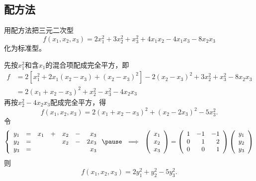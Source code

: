 \subsection{配方法}


\begin{frame}
  
    \begin{li}
      用配方法把三元二次型
      $$
      f(x_1,x_2,x_3)=2x_1^2+3x_2^2+x_3^2+4x_1x_2-4x_1x_3-8x_2x_3
      $$
      化为标准型。
    \end{li}
    \begin{jie}
    先按$x_1^2$和含$x_1$的混合项配成完全平方，即
    $$
    \begin{array}{rl}
      f&=2[x_1^2+2x_1(x_2-x_3)+(x_2-x_3)^2]-2(x_2-x_3)^2+3x_2^2+x_3^2-8x_2x_3\\[0.1in]
      &=2(x_1+x_2-x_3)^2+x_2^2-x_3^2-4x_2x_3
    \end{array}
    $$\pause
    再按$x_2^2-4x_2x_3$配成完全平方，得
    $$
    f(x_1,x_2,x_3)=2(x_1+x_2-x_3)^2+(x_2-2x_3)^2-5x_3^2.
    $$
    \pause
    令
    $$
    \left\{
    \begin{array}{rcrcrcr}
      y_1&=&x_1&+&x_2&-&x_3\\
      y_2&=& &&x_2&-&2x_3\\
      y_3&=&&&&&x_3
    \end{array}
    \right. \pause ~~\Longrightarrow~~
    \left(
    \begin{array}{c}
      x_1\\
      x_2\\
      x_3
    \end{array}
    \right)=
    \left(
    \begin{array}{rrr}
      1&-1&-1\\
      0&1&2\\
      0&0&1
    \end{array}
    \right)
    \left(
    \begin{array}{c}
      y_1\\
      y_2\\
      y_3
    \end{array}
    \right)
    $$ \pause 
    则
    $$
    f(x_1,x_2,x_3)=2y_1^2+y_2^2-5y_3^2.
    $$

    \end{jie}
  
\end{frame}


